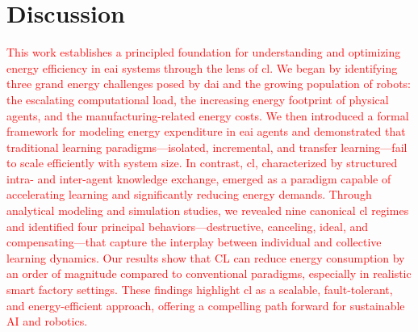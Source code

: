 \documentclass[12pt]{article}
\newcommand\myhl[1]{\textcolor{red}{#1}}
\begin{document}
\section*{Discussion}\label{sec:discussion}

\myhl{This work establishes a principled foundation for understanding and optimizing energy efficiency in \ac{eai} systems through the lens of \ac{cl}. We began by identifying three grand energy challenges posed by \ac{dai} and the growing population of robots: the escalating computational load, the increasing energy footprint of physical agents, and the manufacturing-related energy costs. We then introduced a formal framework for modeling energy expenditure in \ac{eai} agents and demonstrated that traditional learning paradigms---isolated, incremental, and transfer learning---fail to scale efficiently with system size. In contrast, \acl{cl}, characterized by structured intra- and inter-agent knowledge exchange, emerged as a paradigm capable of accelerating learning and significantly reducing energy demands. Through analytical modeling and simulation studies, we revealed nine canonical \ac{cl} regimes and identified four principal behaviors---destructive, canceling, ideal, and compensating---that capture the interplay between individual and collective learning dynamics. Our results show that CL can reduce energy consumption by an order of magnitude compared to conventional paradigms, especially in realistic smart factory settings. These findings highlight \ac{cl} as a scalable, fault-tolerant, and energy-efficient approach, offering a compelling path forward for sustainable AI and robotics.}

\end{document}
